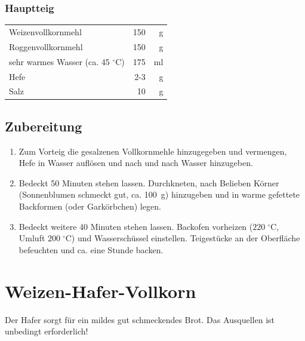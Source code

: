 \subsubsection*{Hauptteig}
\begin{tabular}{lrr}
    Weizenvollkornmehl & 150 &  g \\
    Roggenvollkornmehl & 150 &  g \\
    sehr warmes Wasser (ca. 45 $^\circ$C) & 175 & ml \\
    Hefe   & 2-3          &   g \\
    Salz        & 10 & g \\
\end{tabular} 

\subsection*{Zubereitung}

\begin{enumerate}
    \item Zum Vorteig die gesalzenen Vollkornmehle hinzugegeben und vermengen, Hefe in Wasser auflösen und nach und nach Wasser hinzugeben.
    \item Bedeckt 50 Minuten stehen lassen. Durchkneten, nach Belieben Körner (Sonnenblumen schmeckt gut, ca. 100~g) hinzugeben und in warme gefettete Backformen  (oder Garkörbchen) legen.
    \item Bedeckt weitere 40 Minuten stehen lassen. Backofen vorheizen ($ 220\;^{\circ} $C, Umluft $ 200\;^{\circ} $C) und Wasserschüssel einstellen. Teigestücke an der Oberfläche befeuchten und ca. eine Stunde backen.    
\end{enumerate}  

\section{Weizen-Hafer-Vollkorn} 
Der Hafer sorgt für ein mildes gut schmeckendes Brot. Das Ausquellen ist unbedingt erforderlich!

